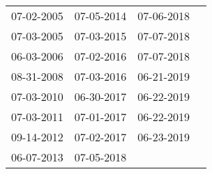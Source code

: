 \begin{supertabular}{llll}
 07-02-2005 &  07-05-2014 &  07-06-2018 \\
 07-03-2005 &  07-03-2015 &  07-07-2018 \\
 06-03-2006 &  07-02-2016 &  07-07-2018 \\
 08-31-2008 &  07-03-2016 &  06-21-2019 \\
 07-03-2010 &  06-30-2017 &  06-22-2019 \\
 07-03-2011 &  07-01-2017 &  06-22-2019 \\
 09-14-2012 &  07-02-2017 &  06-23-2019 \\
 06-07-2013 &  07-05-2018 &             \\
\end{supertabular}
